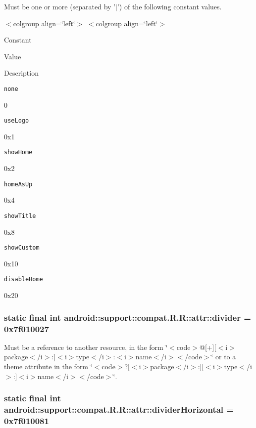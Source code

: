 Must be one or more (separated by '$|$') of the following constant values. \begin{TabularC}{0}
\hline
\end{TabularC}
$<$colgroup align=\char`\"{}left\char`\"{}$>$ $<$colgroup align=\char`\"{}left\char`\"{}$>$ 

Constant

Value

Description 

{\tt none}

0

{\tt useLogo}

0x1

{\tt showHome}

0x2

{\tt homeAsUp}

0x4

{\tt showTitle}

0x8

{\tt showCustom}

0x10

{\tt disableHome}

0x20\hypertarget{classandroid_1_1support_1_1compat_1_1_r_1_1attr_214d31d145c52bf4263a1a4011ef3364}{
\subsubsection[{divider}]{\setlength{\rightskip}{0pt plus 5cm}static final int android::support::compat.R.R::attr::divider = 0x7f010027}}
\label{classandroid_1_1support_1_1compat_1_1_r_1_1attr_214d31d145c52bf4263a1a4011ef3364}


Must be a reference to another resource, in the form \char`\"{}$<$code$>$@\mbox{[}+\mbox{]}\mbox{[}$<$i$>$package$<$/i$>$:\mbox{]}$<$i$>$type$<$/i$>$:$<$i$>$name$<$/i$>$$<$/code$>$\char`\"{} or to a theme attribute in the form \char`\"{}$<$code$>$?\mbox{[}$<$i$>$package$<$/i$>$:\mbox{]}\mbox{[}$<$i$>$type$<$/i$>$:\mbox{]}$<$i$>$name$<$/i$>$$<$/code$>$\char`\"{}. \hypertarget{classandroid_1_1support_1_1compat_1_1_r_1_1attr_0f37214bd26dc24dc839dc1f5cd4af6d}{
\subsubsection[{dividerHorizontal}]{\setlength{\rightskip}{0pt plus 5cm}static final int android::support::compat.R.R::attr::dividerHorizontal = 0x7f010081}}
\label{classandroid_1_1support_1_1compat_1_1_r_1_1attr_0f37214bd26dc24dc839dc1f5cd4af6d}


